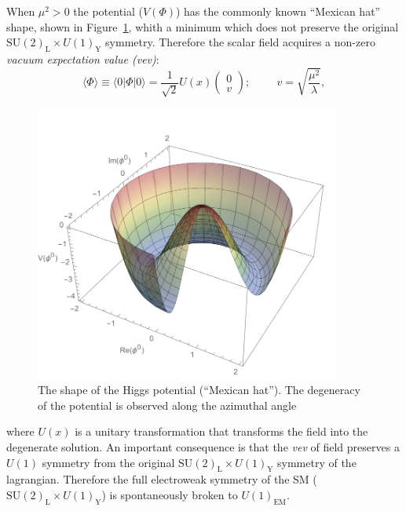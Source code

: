 When $\mu^{2} > 0$ the potential ($V(\Phi)$) has the commonly known
``Mexican hat'' shape, shown in Figure~\ref{fig:MexHat}, whith a minimum which does not preserve the
original $\mathrm{SU(2)_{L}}\times U(1)_{\mathrm{Y}}$
symmetry. Therefore the scalar field acquires a non-zero
\textit{vacuum expectation value (vev)}:
\begin{equation}
\label{eq:vev}
\langle \Phi \rangle \equiv \langle 0 | \Phi | 0\rangle = \frac{1}{\sqrt{2}}U(x) \begin{pmatrix} 0\\
  v\end{pmatrix}; \hspace{1cm}v = \sqrt{\frac{\mu^{2}}{\lambda}},
\end{equation}

\begin{figure}
 \centering
\includegraphics[width=0.9\textwidth]{IntroFigures/HiggsPotential.pdf}
 \caption{The shape of the Higgs potential (``Mexican hat''). The
   degeneracy of the potential is observed along the azimuthal angle\label{fig:MexHat}}
\end{figure}

where $U(x)$ is a unitary transformation that transforms the field
into the degenerate solution. An important consequence is that the
\textit{vev} of field preserves a $U(1)$ symmetry from the original
$\mathrm{SU(2)_{L}}\times U(1)_{\mathrm{Y}}$ symmetry of the
lagrangian. Therefore the full electroweak symmetry of the SM
($\mathrm{SU(2)_{L}}\times U(1)_{\mathrm{Y}}$) is spontaneously broken
to $U(1)_{\mathrm{EM}}$.

